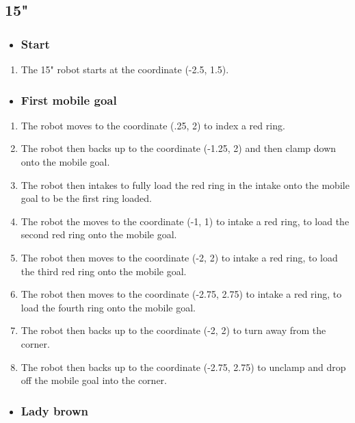 \subsection{15"}
\begin{itemize}
    \item \subsubsection{Start}
\end{itemize}
\begin{enumerate}
    \item The 15" robot starts at the coordinate (-2.5, 1.5).
\end{enumerate}
\begin{itemize}
    \item \subsubsection{First mobile goal}
\end{itemize}
\begin{enumerate}
    \item The robot moves to the coordinate (.25, 2) to index a red ring.
    \item The robot then backs up to the coordinate (-1.25, 2) and then clamp down onto the mobile goal.
    \item The robot then intakes to fully load the red ring in the intake onto the mobile goal to be the first ring loaded.
    \item The robot the moves to the coordinate (-1, 1) to intake a red ring, to load the second red ring onto the mobile goal.
    \item The robot then moves to the coordinate (-2, 2) to intake a red ring, to load the third red ring onto the mobile goal.
    \item The robot then moves to the coordinate (-2.75, 2.75) to intake a red ring, to load the fourth ring onto the mobile goal.
    \item The robot then backs up to the coordinate (-2, 2) to turn away from the corner.
    \item The robot then backs up to the coordinate (-2.75, 2.75) to unclamp and drop off the mobile goal into the corner.
\end{enumerate}
\begin{itemize}
    \item \subsubsection{Lady brown}
\end{itemize}
